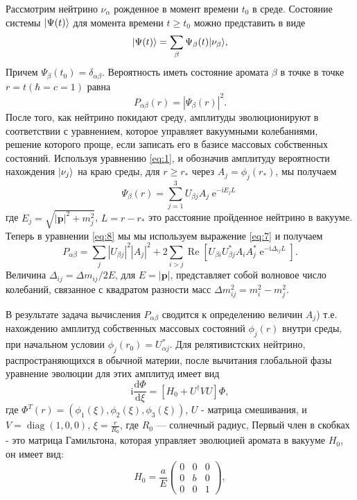 \documentclass[a4paper,12pt]{article}
\newcommand\Vect[1]{{\boldsymbol{#1}}}
\newcommand{\dd}{\mathrm{d}}
\newcommand{\diag}{\operatorname{diag}}
\renewcommand{\Re}{\operatorname{Re}}
\renewcommand{\exp}{\operatorname{e}}
\renewcommand{\imath}{\mathrm{i}}
\DeclarePairedDelimiter\ket{|}{\rangle}
\begin{document}
	Рассмотрим нейтрино \(\nu_{\alpha}\) рожденное в момент времени
	\(t_{0}\) в среде. Состояние системы \(\ket{\Psi(t)}\) для момента времени \(t\geq t_{0}\) можно представить в виде
	\begin{equation}
		\ket{\Psi(t)}=\sum_{\beta}\Psi_{\beta}(t)\ket{\nu_{\beta}},
	\end{equation}
	Причем \(\Psi_{\beta}(t_{0})=\delta_{\alpha\beta}\). Вероятность иметь состояние аромата \(\beta\) в точке в точке \(r=t (\hbar=c=1)\) равна
	\begin{equation}\label{eq:8}
		P_{\alpha\beta}(r)=|\Psi_{\beta}(r)|^{2}.
	\end{equation}
	После того, как нейтрино покидают среду, амплитуды
	эволюционируют в соответствии с уравнением, которое
	управляет вакуумными колебаниями, решение которого
	проще, если записать его в базисе массовых собственных
	состояний. Используя уравнению \eqref{eq:1}, и обозначив амплитуду вероятности нахождения
	\(\ket{\nu_{j}}\) на краю среды, для \(r\geq r_{*}\) через \(A_{j}=\phi_{j}(r_{*})\), мы получаем
	\begin{equation}\label{eq:7}
		\Psi_{\beta}(r)=\sum_{j=1}^{3}U_{\beta j}A_{j}\exp^{-\imath E_{j}L}
	\end{equation}
	где \(E_{j}=\sqrt{|\Vect{p}|^{2}+m_{j}^{2}}\), \(L=r-r_{*}\) это расстояние
	пройденное нейтрино в вакууме. Теперь в
	уравнении \eqref{eq:8} мы мы используем выражение \eqref{eq:7} и получаем
	\begin{equation}
		P_{\alpha\beta}=\sum_{j}|U_{\beta j}|^{2}|A_{j}|^{2}+2\sum_{i>j}\Re[U_{\beta i}U_{\beta j}^{*}A_{i}A_{j}^{*}\exp^{-\imath\Delta_{ij}L}].
	\end{equation}
	Величина \(\Delta_{ij}=\Delta m_{ij}/2E\), для \(E=|\Vect{p}|\), представляет собой  волновое число колебаний, связанное с квадратом разности масс
	\(\Delta m_{ij}^{2}=m_{i}^{2}-m_{j}^{2}\).
	
	В результате задача вычисления \(P_{\alpha\beta}\) сводится к
	определению величин \(A_{j}\)) т.е. нахождению амплитуд
	собственных массовых состояний \(\phi_{j}(r)\) внутри среды, при начальном условии \(\phi_{j}(r_{0})=U_{\alpha j}^{*}\). Для релятивистских нейтрино, распространяющихся в обычной материи, после вычитания глобальной фазы уравнение эволюции для этих амплитуд имеет вид
	\begin{equation}\label{eq:18}
		\imath\frac{\dd\Phi}{\dd\xi}=[H_{0}+U^{\dagger}VU]\Phi,
	\end{equation}
	где \(\Phi^{T}(r)=(\phi_{1}(\xi),\phi_{2}(\xi),\phi_{3}(\xi))\), \(U\) - матрица
	смешивания, и \(V=\diag(1,0,0)\), \(\xi=\frac{r}{R_{0}}\), где \(R_{0}\) --- солнечный радиус, Первый член в скобках - это матрица Гамильтона, которая управляет эволюцией аромата в вакууме \(H_{0}\), он имеет вид:
	\begin{equation}
		H_{0}=\frac{a}{E}
		\begin{pmatrix}
			0 & 0 & 0\\
			0 & b & 0\\
			0 & 0 & 1
		\end{pmatrix},
	\end{equation}
	
\end{document}

